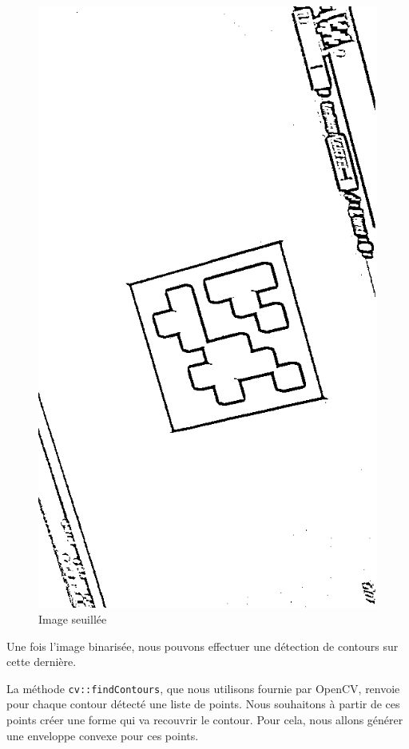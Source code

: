         \begin{figure}[!h]
            \centering
            \includegraphics[scale=0.25]{img/threshold.png}
            \caption{Image seuillée}
        \end{figure}

        Une fois l'image binarisée, nous pouvons effectuer une détection de contours sur cette dernière.

        La méthode \verb|cv::findContours|, que nous utilisons fournie par OpenCV, renvoie pour chaque contour détecté une liste de points. Nous souhaitons à partir de ces points créer une forme qui va recouvrir le contour. Pour cela, nous allons générer une enveloppe convexe pour ces points.

